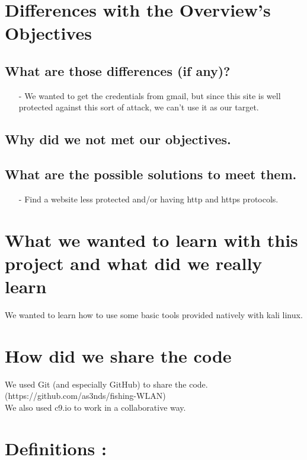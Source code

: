 \documentclass[a4paper, 11pt, oneside]{article}
\begin{document}
\section{Differences with the Overview's Objectives}

\subsection{What are those differences (if any)?}
\begin{itemize}
    \item[-] We wanted to get the credentials from gmail, but since this site is well protected against this sort of attack, we can't use it as our target.\\
\end{itemize}

\subsection{Why did we not met our objectives.}

\subsection{What are the possible solutions to meet them.}
\begin{itemize}
    \item[-] Find a website less protected and/or having http and https protocols.\\
\end{itemize}

\section{What we wanted to learn with this project and what did we really learn}
We wanted to learn how to use some basic tools provided natively with kali linux.\\

\section{How did we share the code}
We used Git (and especially GitHub) to share the code. (https://github.com/as3nds/fishing-WLAN)\\
We also used c9.io to work in a collaborative way.\\

\section*{Definitions :}
\end{document}
